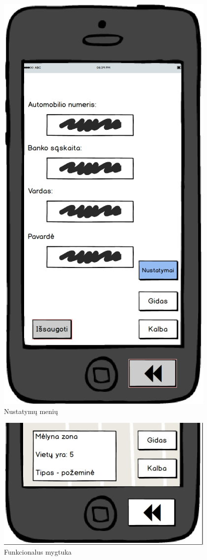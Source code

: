 \documentclass{VUMIFPSkursinis}
\begin{document}
\begin{figure}[H]
    \centering
    \includegraphics[scale=0.5]{img/mig1}
	\caption{Nustatymų menių \label{fig:mig1}}
\end{figure}

\begin{figure}[H]
    \centering
    \includegraphics[scale=0.5]{img/mig2}
	\caption{Funkcionalus mygtuka \label{fig:mig2}}
\end{figure}
\end{document}
